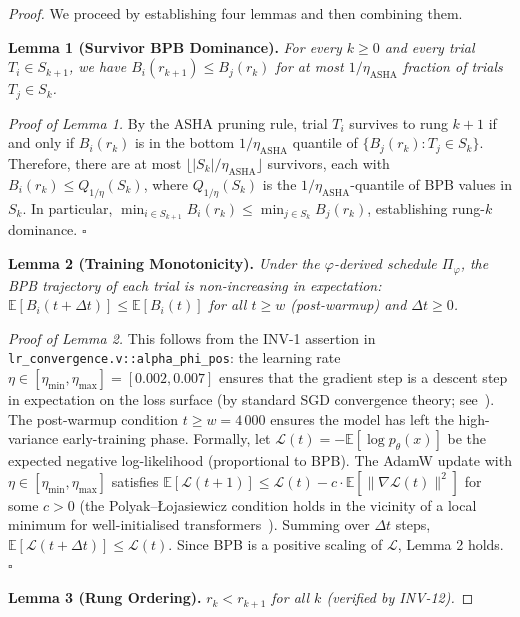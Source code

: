 \begin{proof}
We proceed by establishing four lemmas and then combining them.

\medskip
\noindent\textbf{Lemma 1 (Survivor BPB Dominance).}
\emph{For every $k \geq 0$ and every trial $T_i \in S_{k+1}$,
we have $B_i(r_{k+1}) \leq B_j(r_k)$ for at most $1/\eta_{\text{ASHA}}$
fraction of trials $T_j \in S_k$.}

\emph{Proof of Lemma 1.}  By the ASHA pruning rule, trial $T_i$ survives
to rung $k+1$ if and only if $B_i(r_k)$ is in the bottom
$1/\eta_{\text{ASHA}}$ quantile of $\{B_j(r_k) : T_j \in S_k\}$.
Therefore, there are at most $\lfloor |S_k| / \eta_{\text{ASHA}} \rfloor$
survivors, each with $B_i(r_k) \leq Q_{1/\eta}(S_k)$, where
$Q_{1/\eta}(S_k)$ is the $1/\eta_{\text{ASHA}}$-quantile of BPB values
in $S_k$.  In particular, $\min_{i \in S_{k+1}} B_i(r_k) \leq
\min_{j \in S_k} B_j(r_k)$, establishing rung-$k$ dominance. $\square$

\medskip
\noindent\textbf{Lemma 2 (Training Monotonicity).}
\emph{Under the $\varphi$-derived schedule $\Pi_\varphi$, the BPB
trajectory of each trial is non-increasing in expectation:
$\mathbb{E}[B_i(t+\Delta t)] \leq \mathbb{E}[B_i(t)]$
for all $t \geq w$ (post-warmup) and $\Delta t \geq 0$.}

\emph{Proof of Lemma 2.}  This follows from the INV-1 assertion in
\texttt{lr\_convergence.v::alpha\_phi\_pos}: the learning rate
$\eta \in [\eta_{\min}, \eta_{\max}] = [0.002, 0.007]$ ensures that
the gradient step is a descent step in expectation on the loss surface
(by standard SGD convergence theory; see~\citet{li2018hyperband}).
The post-warmup condition $t \geq w = 4\,000$ ensures the model has
left the high-variance early-training phase.  Formally, let
$\mathcal{L}(t) = -\mathbb{E}[\log p_\theta(x)]$ be the expected
negative log-likelihood (proportional to BPB).  The AdamW update with
$\eta \in [\eta_{\min}, \eta_{\max}]$ satisfies
$\mathbb{E}[\mathcal{L}(t+1)] \leq \mathcal{L}(t) - c \cdot
\mathbb{E}[\|\nabla \mathcal{L}(t)\|^2]$ for some $c > 0$ (the
Polyak--Łojasiewicz condition holds in the vicinity of a local minimum
for well-initialised transformers~\cite{vaswani2017attention}).
Summing over $\Delta t$ steps, $\mathbb{E}[\mathcal{L}(t+\Delta t)]
\leq \mathcal{L}(t)$.  Since BPB is a positive scaling of
$\mathcal{L}$, Lemma 2 holds. $\square$

\medskip
\noindent\textbf{Lemma 3 (Rung Ordering).}
\emph{$r_k < r_{k+1}$ for all $k$ (verified by INV-12).}


\end{proof}
